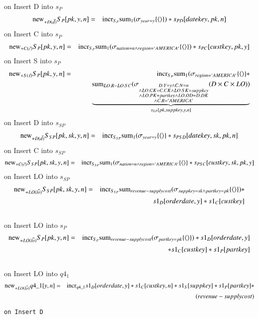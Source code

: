 on Insert D into $s_{P}$
\begin{eqnarray}
\mathrm{new}_{+D(\vec{d})} S_{P} [pk, y, n] &=& \mathrm{incr}_{S_{P}}
\mathrm{sum}_{1} (\sigma_{year = y} \{{\langle\rangle}\}) * s_{PD} [datekey, pk, n]
\end{eqnarray}
on Insert C into $s_{P}$
\begin{eqnarray}
\mathrm{new}_{+C(\vec{c})} S_{P} [pk, y, n] &=& \mathrm{incr}_{S_{P}}
\mathrm{sum}_{1} (\sigma_{nation = n \wedge region = `AMERICA'} \{{\langle\rangle}\}) * s_{PC} [custkey, pk, y]
\end{eqnarray}
on Insert S into $s_{P}$
\begin{eqnarray}
\mathrm{new}_{+S(\vec{s})} S_{P} [pk, y, n] &=& \mathrm{incr}_{S_{P}}
\mathrm{sum}_{1} (\sigma_{region = `AMERICA'} \{{\langle\rangle}\} * 
\\\nonumber&&\qquad \underbrace{\mathrm{sum}_{LO.R - LO.SC} (\sigma_{\substack{ D.Y = y \wedge C.N = n \\\wedge LO.CK = C.CK \wedge LO.SK = suppkey \\\wedge LO.PK = partkey \wedge LO.OD = D.DK \\\wedge C.R = 'AMERICA' }} (D \times  C \times  LO))}_{s_{SP} [pk, suppkey, y, n]}
\end{eqnarray}
on Insert D into $s_{SP}$
\begin{eqnarray}
\mathrm{new}_{+D(\vec{d})} S_{SP} [pk, sk, y, n] &=& \mathrm{incr}_{S_{SP}}
\mathrm{sum}_{1} (\sigma_{ year = y } \{{\langle\rangle}\} * s_{PSD} [datekey, sk, pk, n]
\end{eqnarray}
on Insert C into $s_{SP}$
\begin{eqnarray}
\mathrm{new}_{+C(\vec{c})} S_{SP} [pk, sk, y, n] &=& \mathrm{incr}_{S_{SP}}
\mathrm{sum}_{1} (\sigma_{ nation = n \wedge region = `AMERICA'} \{{\langle\rangle}\} * s_{PSC}[custkey, sk, pk, y]
\end{eqnarray}
on Insert LO into $s_{SP}$
\begin{eqnarray}
\mathrm{new}_{+LO(\vec{lo})} S_{SP} [pk, sk, y, n] &=& \mathrm{incr}_{S_{SP}}
\mathrm{sum}_{revenue - supplycost} (\sigma_{ suppkey = sk \wedge partkey = pk} \{{\langle\rangle}\}) * 
\\\nonumber&&\qquad s1_{D}[orderdate, y] * s1_{C}[custkey]
\end{eqnarray}
\\
on Insert LO into $s_{P}$
\begin{eqnarray}
\mathrm{new}_{+LO(\vec{lo})} S_{P} [pk, y, n] &=& \mathrm{incr}_{S_{P}}
\mathrm{sum}_{revenue - supplycost} (\sigma_{ partkey = pk} \{{\langle\rangle}\}) * s1_{D}[orderdate, y] 
\\\nonumber&&\qquad * s1_{C}[custkey] * s1_{P}[partkey]
\end{eqnarray}
\\
on Insert LO into $q4_1$
\begin{eqnarray}
\mathrm{new}_{+LO(\vec{lo})} q4\_1[y,n] 
 &=& \mathrm{incr}_{q4\_1} s1_{D}[orderdate, y] *s1_{C} [custkey, n] *  s1_{S} [suppkey]* s1_{P} [partkey] *\\
\nonumber&& (revenue - supplycost) 
\end{eqnarray}

\pagebreak
\begin{verbatim}
on Insert D
\end{verbatim}
\begin{comment}

\end{comment}